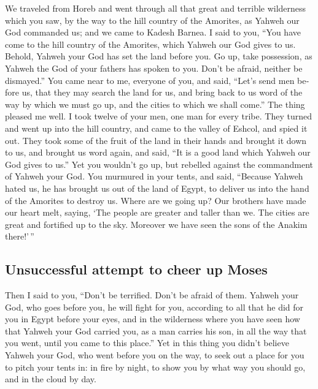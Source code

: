 \begin{paracol}{2}
\begin{otherlanguage}{english}
 We traveled from Horeb and went through all that great
and terrible wilderness which you saw, by the way to the hill country of
the Amorites, as Yahweh our God commanded us; and we came to Kadesh
Barnea.  I said to you, ``You have come to the hill
country of the Amorites, which Yahweh our God gives to us.
 Behold, Yahweh your God has set the land before you. Go
up, take possession, as Yahweh the God of your fathers has spoken to
you. Don't be afraid, neither be dismayed.''  You came
near to me, everyone of you, and said, ``Let's send men before us, that
they may search the land for us, and bring back to us word of the way by
which we must go up, and the cities to which we shall come.''
 The thing pleased me well. I took twelve of your men,
one man for every tribe.  They turned and went up into
the hill country, and came to the valley of Eshcol, and spied it out.
 They took some of the fruit of the land in their hands
and brought it down to us, and brought us word again, and said, ``It is
a good land which Yahweh our God gives to us.''  Yet you
wouldn't go up, but rebelled against the commandment of Yahweh your God.
 You murmured in your tents, and said, ``Because Yahweh
hated us, he has brought us out of the land of Egypt, to deliver us into
the hand of the Amorites to destroy us.  Where are we
going up? Our brothers have made our heart melt, saying, `The people are
greater and taller than we. The cities are great and fortified up to the
sky. Moreover we have seen the sons of the Anakim there!'\,''

\hypertarget{unsuccessful-attempt-to-cheer-up-moses}{%
\subsection{Unsuccessful attempt to cheer up
Moses}\label{unsuccessful-attempt-to-cheer-up-moses}}

 Then I said to you, ``Don't be terrified. Don't be
afraid of them.  Yahweh your God, who goes before you, he
will fight for you, according to all that he did for you in Egypt before
your eyes,  and in the wilderness where you have seen how
that Yahweh your God carried you, as a man carries his son, in all the
way that you went, until you came to this place.''  Yet
in this thing you didn't believe Yahweh your God,  who
went before you on the way, to seek out a place for you to pitch your
tents in: in fire by night, to show you by what way you should go, and
in the cloud by day.


\end{otherlanguage}
\end{paracol}
